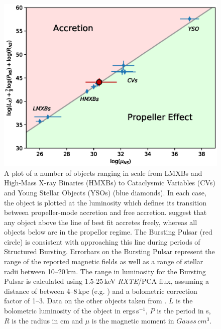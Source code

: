 \begin{figure}
 \centering
 \includegraphics[width=.82\linewidth, trim={0.6cm 0.1cm 1.0cm 1.1cm},clip]{images/propeff.eps}
 \caption[A plot of a number of objects ranging in scale from LMXBs and High-Mass X-ray Binaries (HMXBs) to Cataclysmic Variables (CVs) and Young Stellar Objects (YSOs). In each case, the object is plotted at the luminosity which defines its transition between propeller-mode accretion and free accretion.]{A plot of a number of objects ranging in scale from LMXBs and High-Mass X-ray Binaries (HMXBs) to Cataclysmic Variables (CVs) and Young Stellar Objects (YSOs) (blue diamonds). In each case, the object is plotted at the luminosity which defines its transition between propeller-mode accretion and free accretion. \citealp{Campana_PropBorder} suggest that any object above the line of best fit accretes freely, whereas all objects below are in the propellor regime. The Bursting Pulsar (red circle) is consistent with approaching this line during periods of Structured Bursting. Errorbars on the Bursting Pulsar represent the range of the reported magnetic fields as well as a range of stellar radii between 10--20\,km. The range in luminosity for the Bursting Pulsar is calculated using 1.5-25\,keV \textit{RXTE}/PCA flux, assuming a distance of between 4--8\,kpc (e.g. \citealp{Kouveliotou_BP,Gosling_BPCompanion,Sanna_BP}) and a bolometric correction factor of 1--3.  Data on the other objects taken from \citealp{Campana_PropBorder}. $L$ is the bolometric luminosity of the object in ergs\,s$^{-1}$, $P$ is the period in s, $R$ is the radius in cm and $\mu$ is the magnetic moment in $Gauss\,cm^3$.}
 \label{fig:propBorder}
\end{figure}

